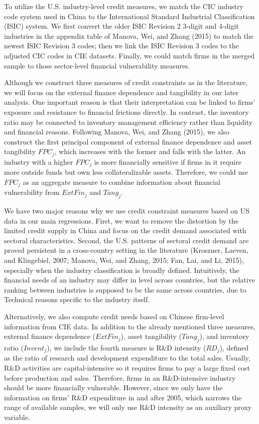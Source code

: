 To utilize the U.S. industry-level credit measures, we match the CIC industry code system used in China to the International Standard Industrial Classification (ISIC) system. We first convert the older ISIC Revision 2 3-digit and 4-digit industries in the appendix table of Manova, Wei, and Zhang (2015) to match the newest ISIC Revision 3 codes; then we link the ISIC Revision 3 codes to the adjusted CIC codes in CIE datasets. Finally, we could match firms in the merged sample to those sector-level financial vulnerability measures.

Although we construct three measures of credit constraints as in the literature, we will focus on the external finance dependence and tangibility in our later analysis. One important reason is that their interpretation can be linked to firms' exposure and resistance to financial frictions directly. In contrast, the inventory ratio may be connected to inventory management efficiency rather than liquidity and financial reasons.  Following Manova, Wei, and Zhang (2015)\cite{manova-wei-zhang2015}, we also construct the first principal component of external finance dependence and asset tangibility $FPC_j$, which increases with the former and falls with the latter. An industry with a higher $FPC_j$ is more financially sensitive if firms in it require more outside funds but own less collateralizable assets. Therefore, we could use $FPC_j$ as an aggregate measure to combine information about financial vulnerability from $ExtFin_j$ and $Tang_j$.

We have two major reasons why we use credit constraint measures based on US data in our main regressions. First, we want to remove the distortion by the limited credit supply in China and focus on the credit demand associated with sectoral characteristics. Second, the U.S. patterns of sectoral credit demand are proved persistent in a cross-country setting in the literature (Kroszner, Laeven, and Klingebiel, 2007\cite{kroszner2007}; Manova, Wei, and Zhang, 2015\cite{manova-wei-zhang2015}; Fan, Lai, and Li, 2015\cite{fan-lai-li2015}), especially when the industry classification is broadly defined. Intuitively, the financial needs of an industry may differ in level across countries, but the relative ranking between industries is supposed to be the same across countries, due to Technical reasons specific to the industry itself.

Alternatively, we also compute credit needs based on Chinese firm-level information from CIE data. In addition to the already mentioned three measures, external finance dependence ($ExtFin_j$), asset tangibility ($Tang_j$), and inventory ratio ($Invent_j$), we include the fourth measure is R\&D intensity ($RD_j$), defined as the ratio of research and development expenditure to the total sales. Usually, R\&D activities are capital-intensive so it requires firms to pay a large fixed cost before production and sales. Therefore, firms in an R\&D-intensive industry should be more financially vulnerable. However, since we only have the information on firms' R\&D expenditure in and after 2005, which narrows the range of available samples, we will only use R\&D intensity as an auxiliary proxy variable.

